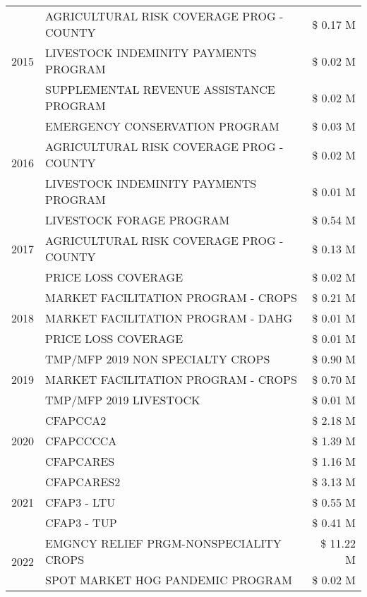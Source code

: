 \begin{tabular}{llr}
\cline{1-3}
\multirow[t]{3}{*}{2015} & AGRICULTURAL RISK COVERAGE PROG - COUNTY & \$ 0.17 M \\
 & LIVESTOCK INDEMINITY PAYMENTS PROGRAM & \$ 0.02 M \\
 & SUPPLEMENTAL REVENUE ASSISTANCE PROGRAM & \$ 0.02 M \\
\cline{1-3}
\multirow[t]{3}{*}{2016} & EMERGENCY CONSERVATION PROGRAM & \$ 0.03 M \\
 & AGRICULTURAL RISK COVERAGE PROG - COUNTY & \$ 0.02 M \\
 & LIVESTOCK INDEMINITY PAYMENTS PROGRAM & \$ 0.01 M \\
\cline{1-3}
\multirow[t]{3}{*}{2017} & LIVESTOCK FORAGE PROGRAM & \$ 0.54 M \\
 & AGRICULTURAL RISK COVERAGE PROG - COUNTY & \$ 0.13 M \\
 & PRICE LOSS COVERAGE & \$ 0.02 M \\
\cline{1-3}
\multirow[t]{3}{*}{2018} & MARKET FACILITATION PROGRAM - CROPS & \$ 0.21 M \\
 & MARKET FACILITATION PROGRAM - DAHG & \$ 0.01 M \\
 & PRICE LOSS COVERAGE & \$ 0.01 M \\
\cline{1-3}
\multirow[t]{3}{*}{2019} & TMP/MFP 2019 NON SPECIALTY CROPS & \$ 0.90 M \\
 & MARKET FACILITATION PROGRAM - CROPS & \$ 0.70 M \\
 & TMP/MFP 2019 LIVESTOCK & \$ 0.01 M \\
\cline{1-3}
\multirow[t]{3}{*}{2020} & CFAPCCA2 & \$ 2.18 M \\
 & CFAPCCCCA & \$ 1.39 M \\
 & CFAPCARES & \$ 1.16 M \\
\cline{1-3}
\multirow[t]{3}{*}{2021} & CFAPCARES2 & \$ 3.13 M \\
 & CFAP3 - LTU & \$ 0.55 M \\
 & CFAP3 - TUP & \$ 0.41 M \\
\cline{1-3}
\multirow[t]{2}{*}{2022} & EMGNCY RELIEF PRGM-NONSPECIALITY CROPS & \$ 11.22 M \\
 & SPOT MARKET HOG PANDEMIC PROGRAM & \$ 0.02 M \\
\cline{1-3}
\bottomrule
\end{tabular}
